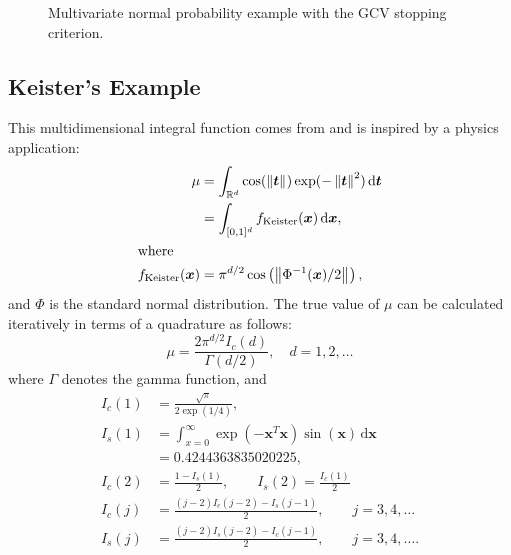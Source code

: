 \documentclass{svjour3}                     %
\newcommand{\bm}[1]{\boldsymbol{#1}}
\newcommand{\dif}[1]{\text{d}{#1}}
\newcommand{\reals}{\mathbb{R}}
\newcommand{\vt}{\bm{t}}
\newcommand{\vx}{\bm{x}}
\newcommand{\dvx}{\dif{\bm{x}}}
\newcommand{\dvt}{\dif{\bm{t}}}
\newcommand{\norm}[2][{}]{\ensuremath{\left \lVert #2 \right \rVert}_{#1}}
\begin{document}
{{{{{{\begin{figure}
\caption[Sobol: MVN guaranteed: GCV]{Multivariate normal probability example with the GCV stopping criterion.}
\label{fig:Sobol-mvn-guaranteed-GCV}
\end{figure}






\subsection{Keister's Example}

This multidimensional integral function comes from \cite{Kei96} and is inspired by a physics application:
\begin{align}
\label{eqn:keister_integral}
\mu & =  \int_{\reals^d} \cos(\norm{ \vt}) \exp(-\norm{ \vt }^2) \, \dvt \\
\nonumber
& = \int_{[0,1]^d} f_{\textup{Keister}}(\vx) \, \dvx,\\
\intertext{where }
\nonumber
f_\textup{Keister}(\vx) &= \pi^{d/2} \cos\left(\norm{ \Phi^{-1}(\vx)/2}\right)  ,
\end{align}
and $\Phi$ is the standard normal distribution.
The true value of $\mu$ can be calculated iteratively in terms of a quadrature as follows:  
\begin{equation*}
\mu = \frac{2 \pi^{d/2} I_c(d)}{\Gamma(d/2)}, \quad d=1,2, \ldots
\end{equation*}
where $\Gamma$ denotes the gamma function, and
\begin{align*}
I_c(1) &= \frac{\sqrt{\pi}}{2 \exp(1/4)}, 
\\
I_s(1) &= \int_{x=0}^\infty \exp(-\vx^T\vx)\sin(\vx) \, \dvx 
\\
& =  0.4244363835020225,
\\
I_c(2) &= \frac{1-I_s(1)}{2}, \qquad
I_s(2) = \frac{I_c(1)}{2}
\\
I_c(j) &= \frac{(j-2)I_c(j-2)-I_s(j-1)}{2},
\qquad j =3,4,\ldots
\\
I_s(j) &= \frac{(j-2)I_s(j-2)-I_c(j-1)}{2},
\qquad j =3,4,\ldots.
\end{align*}


}}}}}}
\end{document}
